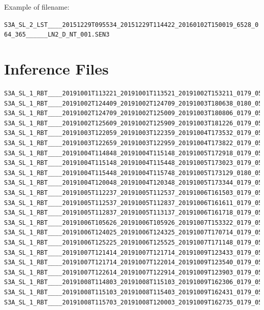 \documentclass[sigplan,screen]{acmart}
\begin{document}
Example of filename:


\verb|S3A_SL_2_LST____20151229T095534_20151229T114422_20160102T150019_6528_064_365______LN2_D_NT_001.SEN3|

\section{Inference Files}

\begin{verbatim}
S3A_SL_1_RBT____20191001T113221_20191001T113521_20191002T153211_0179_050_023_1980_LN2_O_NT_003.hdf
S3A_SL_1_RBT____20191002T124409_20191002T124709_20191003T180638_0180_050_038_1800_LN2_O_NT_003.hdf
S3A_SL_1_RBT____20191002T124709_20191002T125009_20191003T180806_0179_050_038_1980_LN2_O_NT_003.hdf
S3A_SL_1_RBT____20191002T125609_20191002T125909_20191003T181226_0179_050_038_2520_LN2_O_NT_003.hdf
S3A_SL_1_RBT____20191003T122059_20191003T122359_20191004T173532_0179_050_052_1980_LN2_O_NT_003.hdf
S3A_SL_1_RBT____20191003T122659_20191003T122959_20191004T173822_0179_050_052_2340_LN2_O_NT_003.hdf
S3A_SL_1_RBT____20191004T114848_20191004T115148_20191005T172918_0179_050_066_1620_LN2_O_NT_003.hdf
S3A_SL_1_RBT____20191004T115148_20191004T115448_20191005T173023_0179_050_066_1800_LN2_O_NT_003.hdf
S3A_SL_1_RBT____20191004T115448_20191004T115748_20191005T173129_0180_050_066_1980_LN2_O_NT_003.hdf
S3A_SL_1_RBT____20191004T120048_20191004T120348_20191005T173344_0179_050_066_2340_LN2_O_NT_003.hdf
S3A_SL_1_RBT____20191005T112237_20191005T112537_20191006T161503_0179_050_080_1620_LN2_O_NT_003.hdf
S3A_SL_1_RBT____20191005T112537_20191005T112837_20191006T161611_0179_050_080_1800_LN2_O_NT_003.hdf
S3A_SL_1_RBT____20191005T112837_20191005T113137_20191006T161718_0179_050_080_1980_LN2_O_NT_003.hdf
S3A_SL_1_RBT____20191006T105626_20191006T105926_20191007T153322_0179_050_094_1620_LN2_O_NT_003.hdf
S3A_SL_1_RBT____20191006T124025_20191006T124325_20191007T170714_0179_050_095_1800_LN2_O_NT_003.hdf
S3A_SL_1_RBT____20191006T125225_20191006T125525_20191007T171148_0179_050_095_2520_LN2_O_NT_003.hdf
S3A_SL_1_RBT____20191007T121414_20191007T121714_20191009T123433_0179_050_109_1800_LN2_O_NT_003.hdf
S3A_SL_1_RBT____20191007T121714_20191007T122014_20191009T123540_0179_050_109_1980_LN2_O_NT_003.hdf
S3A_SL_1_RBT____20191007T122614_20191007T122914_20191009T123903_0179_050_109_2520_LN2_O_NT_003.hdf
S3A_SL_1_RBT____20191008T114803_20191008T115103_20191009T162306_0179_050_123_1800_LN2_O_NT_003.hdf
S3A_SL_1_RBT____20191008T115103_20191008T115403_20191009T162431_0179_050_123_1980_LN2_O_NT_003.hdf
S3A_SL_1_RBT____20191008T115703_20191008T120003_20191009T162735_0179_050_123_2340_LN2_O_NT_003.hdf

\end{verbatim}
\end{document}

